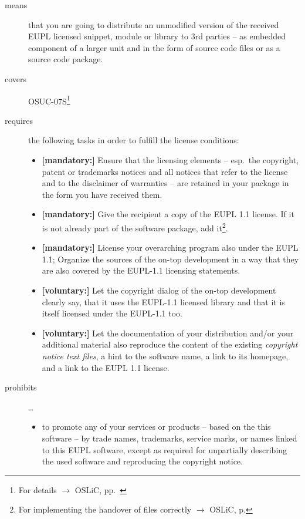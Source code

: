 \begin{description}

\item[means] that you are going to distribute an unmodified version of the
received EUPL licensed snippet, module or library to 3rd parties -- as embedded
component of a larger unit and in the form of source code files or as a source
code package.

\item[covers] OSUC-07S\footnote{For details $\rightarrow$
OSLiC, pp.\ \pageref{OSUC-057-DEF}}

\item[requires] the following tasks in order to fulfill the license conditions:
\begin{itemize}
  
  \item \textbf{[mandatory:]} Ensure that the licensing elements -- esp.\ the
  copyright, patent or trademarks notices and all notices that refer to the
  license and to the disclaimer of warranties -- are retained in your package in
  the form you have received them.
  
  \item \textbf{[mandatory:]} Give the recipient a copy of the EUPL 1.1
  license. If it is not already part of the software package, add
  it\footnote{For implementing the handover of files correctly $\rightarrow$
  OSLiC, p. \pageref{DistributingFilesHint}}.
  
  \item \textbf{[mandatory:]} License your overarching program also under the
  EUPL 1.1; Organize the sources of the on-top development in a way that they
  are also covered by the EUPL-1.1 licensing statements.

  \item \textbf{[voluntary:]} Let the copyright dialog of the on-top development
  clearly say, that it uses the EUPL-1.1 licensed library and that it is itself
  licensed under the EUPL-1.1 too.
  
  \item \textbf{[voluntary:]} Let the documentation of your distribution and/or
  your additional material also reproduce the content of the existing
  \emph{copyright notice text files}, a hint to the software name, a link to its
  homepage, and a link to the EUPL 1.1 license.
\end{itemize}

\item[prohibits] \ldots
\begin{itemize}
  \item to promote any of your services or products -- based on the this software
  -- by trade names, trademarks, service marks, or names linked to this EUPL
  software, except as required for unpartially describing the used software and
  reproducing the copyright notice.
\end{itemize}

\end{description}


